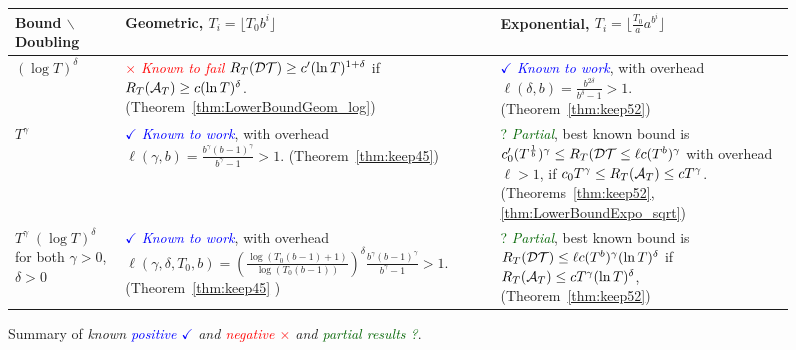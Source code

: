 \documentclass[12pt]{colt2018} %
\begin{document}
\begin{figure}[!t]
    \centering
    \begin{tabular}{M{3cm}|M{5cm}|M{6cm}}
        Bound $\backslash$ Doubling
        & Geometric, $T_i = \lfloor T_0 b^i\rfloor$
        & Exponential, $T_i = \lfloor \frac{T_0}{a} a^{b^i}\rfloor$
        \tabularnewline
        \hline
        \hline
        $(\log T)^{\delta}$
        & \textcolor{red}{$\times$ \emph{Known to fail}}
        \newline
        $R_T(\mathcal{DT}) \geq c' (\ln T)^{1+\delta}$ if $R_T(\mathcal{A}_T) \geq c (\ln T)^{\delta}$.
        \newline
        (Theorem~\ref{thm:LowerBoundGeom_log})
        & \textcolor{blue}{$\checkmark$ \emph{Known to work}}, with overhead $\ell(\delta, b) = \frac{b^{2\delta}}{b^{\delta}-1} > 1$.
        \newline
        (Theorem~\ref{thm:keep52})
        \tabularnewline
        \hline
        $T^{\gamma}$
        & \textcolor{blue}{$\checkmark$ \emph{Known to work}}, with overhead $\ell(\gamma, b) = \frac{b^{\gamma}(b-1)^{\gamma}}{b^{\gamma}-1} > 1$.
        \newline
        (Theorem~\ref{thm:keep45})
        & \textcolor{darkgreen}{? \emph{Partial}}, best known bound is $c_0' (T^{\frac{1}{b}})^{\gamma} \leq R_T (\mathcal{DT} \leq \ell c (T^b)^{\gamma}$
        with overhead $\ell>1$,
        if $c_0 T^{\gamma} \leq R_T(\mathcal{A}_T) \leq c T^{\gamma}$.
        \newline
        (Theorems~\ref{thm:keep52}, \ref{thm:LowerBoundExpo_sqrt})
        \tabularnewline
        \hline
        $T^{\gamma} \; (\log T)^{\delta}$
        \newline
        for both
        \newline
        $\gamma>0$, $\delta>0$
        & \textcolor{blue}{$\checkmark$ \emph{Known to work}}, with overhead $\ell(\gamma, \delta, T_0, b) = \left(\frac{\log(T_0 (b-1) + 1)}{\log(T_0 (b-1))} \right)^{\delta} \frac{b^{\gamma}(b-1)^{\gamma}}{b^{\gamma}-1} > 1$.
        \newline
        (Theorem~\ref{thm:keep45} )
        & \textcolor{darkgreen}{? \emph{Partial}}, best known bound is $R_T (\mathcal{DT}) \leq \ell c (T^b)^{\gamma} (\ln T)^{\delta}$ if $R_T(\mathcal{A}_T) \leq c T^{\gamma} (\ln T)^{\delta}$,
        \newline
        (Theorem~\ref{thm:keep52})
    \end{tabular}
    \caption{Summary of \emph{known \textcolor{blue}{positive $\checkmark$} and \textcolor{red}{negative $\times$} and \textcolor{darkgreen}{partial results ?}}.}
    \label{fig:array_conclusion}
\end{figure}
\end{document}
